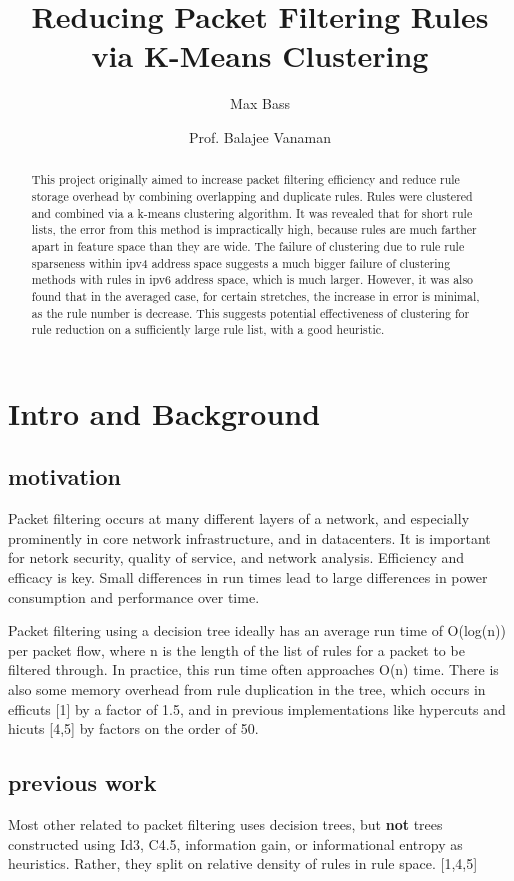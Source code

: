 \documentclass[11pt,letterpaper]{article}
\title{Reducing Packet Filtering Rules via K-Means Clustering}
\author{Max Bass \and Prof. Balajee Vanaman}
\date{}
\begin{document}
\maketitle

\begin{abstract}
This project originally aimed to increase packet filtering efficiency and reduce rule storage overhead by  combining overlapping and duplicate rules. Rules were clustered and combined via a k-means clustering algorithm. It was revealed that for short rule lists, the error from this method is impractically high, because rules are much farther apart in feature space than they are wide. The failure of clustering due to rule rule sparseness within ipv4 address space suggests a much bigger failure of clustering methods with rules in ipv6 address space, which is much larger. However, it was also found that in the averaged case, for certain stretches, the increase in error is minimal, as the rule number is decrease. This suggests potential effectiveness of clustering for rule reduction on a sufficiently large rule list, with a good heuristic.
\end{abstract}


\section{Intro and Background}

\subsection{motivation}
Packet filtering occurs at many different layers of a network, and especially prominently in core network infrastructure, and in datacenters. It is important for netork security, quality of service, and network analysis. Efficiency and efficacy is key. Small differences in run times lead to large differences in power consumption and performance over time.

Packet filtering using a decision tree ideally has an average run time of O(log(n)) per packet flow, where n is the length of the list of rules for a packet to be filtered through. In practice, this run time often approaches O(n) time. There is also some memory overhead from rule duplication in the tree, which occurs in efficuts [1] by a factor of 1.5, and in previous implementations like hypercuts and hicuts [4,5] by factors on the order of 50. 


\subsection{previous work}
Most other related to packet filtering uses decision trees, but {\bf not} trees constructed using Id3, C4.5, information gain, or informational entropy as heuristics. Rather, they split on relative density of rules in rule space. [1,4,5]
\end{document}
